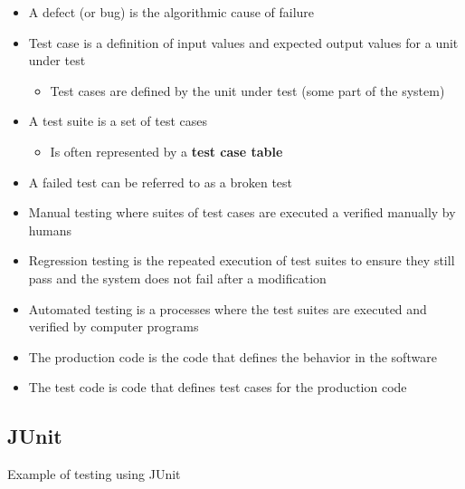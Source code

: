 \documentclass[11pt]{article}
\providecommand{\tightlist}{%
      \setlength{\itemsep}{0pt}\setlength{\parskip}{0pt}}
\begin{document}
\begin{itemize}
\tightlist
\item
  A defect (or bug) is the algorithmic cause of failure
\item
  Test case is a definition of input values and expected output values
  for a unit under test

  \begin{itemize}
  \tightlist
  \item
    Test cases are defined by the unit under test (some part of the
    system)
  \end{itemize}
\item
  A test suite is a set of test cases

  \begin{itemize}
  \tightlist
  \item
    Is often represented by a \textbf{test case table}
  \end{itemize}
\item
  A failed test can be referred to as a broken test
\item
  Manual testing where suites of test cases are executed a verified
  manually by humans
\item
  Regression testing is the repeated execution of test suites to ensure
  they still pass and the system does not fail after a modification
\item
  Automated testing is a processes where the test suites are executed
  and verified by computer programs
\item
  The production code is the code that defines the behavior in the
  software
\item
  The test code is code that defines test cases for the production code
\end{itemize}

\hypertarget{junit}{%
\subsection{JUnit}\label{junit}}

Example of testing using JUnit
\end{document}

